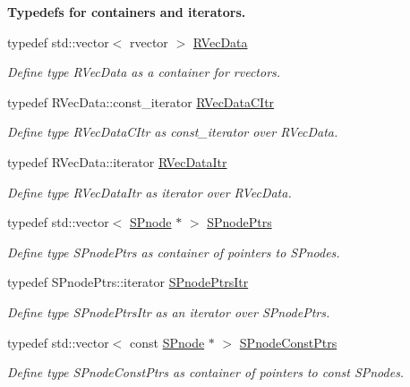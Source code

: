 \begin{Indent}{\bf \-Typedefs for containers and iterators.}
\begin{DoxyCompactItemize}
typedef std\-::vector$<$ rvector $>$ \hyperlink{namespacesubpavings_a30e15e24c8d81a2160d7422ef3c39d68}{\-R\-Vec\-Data}
\begin{DoxyCompactList}\small\item\em \-Define type \-R\-Vec\-Data as a container for rvectors. \end{DoxyCompactList}\item 
typedef \-R\-Vec\-Data\-::const\-\_\-iterator \hyperlink{namespacesubpavings_a0e6592215c5f3504143e6c5ac38dcfec}{\-R\-Vec\-Data\-C\-Itr}
\begin{DoxyCompactList}\small\item\em \-Define type \-R\-Vec\-Data\-C\-Itr as const\-\_\-iterator over \-R\-Vec\-Data. \end{DoxyCompactList}\item 
typedef \-R\-Vec\-Data\-::iterator \hyperlink{namespacesubpavings_aa990935cb163d8eb54f28df1a3508af0}{\-R\-Vec\-Data\-Itr}
\begin{DoxyCompactList}\small\item\em \-Define type \-R\-Vec\-Data\-Itr as iterator over \-R\-Vec\-Data. \end{DoxyCompactList}\item 
typedef std\-::vector$<$ \hyperlink{classsubpavings_1_1SPnode}{\-S\-Pnode} $\ast$ $>$ \hyperlink{namespacesubpavings_ad64ec5e254ada5d913b9f7b46dcddc49}{\-S\-Pnode\-Ptrs}
\begin{DoxyCompactList}\small\item\em \-Define type \-S\-Pnode\-Ptrs as container of pointers to \-S\-Pnodes. \end{DoxyCompactList}\item 
typedef \-S\-Pnode\-Ptrs\-::iterator \hyperlink{namespacesubpavings_aa5240e1b99487f2c24014904cf761fc6}{\-S\-Pnode\-Ptrs\-Itr}
\begin{DoxyCompactList}\small\item\em \-Define type \-S\-Pnode\-Ptrs\-Itr as an iterator over \-S\-Pnode\-Ptrs. \end{DoxyCompactList}\item 
typedef std\-::vector$<$ const \*
\hyperlink{classsubpavings_1_1SPnode}{\-S\-Pnode} $\ast$ $>$ \hyperlink{namespacesubpavings_a0c617b55345023a4c205603c167801b6}{\-S\-Pnode\-Const\-Ptrs}
\begin{DoxyCompactList}\small\item\em \-Define type \-S\-Pnode\-Const\-Ptrs as container of pointers to const \-S\-Pnodes. \end{DoxyCompactList}\item 

\end{DoxyCompactItemize}
\end{Indent}
